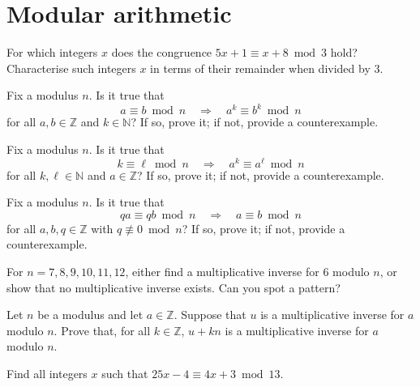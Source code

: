 \section{Modular arithmetic}


\begin{exercise}
For which integers $x$ does the congruence $5x+1 \equiv x+8 \bmod 3$ hold? Characterise such integers $x$ in terms of their remainder when divided by $3$.
\end{exercise}



\begin{exercise}
Fix a modulus $n$. Is it true that
\[ a \equiv b \bmod n \quad \Rightarrow \quad a^k \equiv b^k \bmod n \] for all $a,b \in \mathbb{Z}$ and $k \in \mathbb{N}$? If so, prove it; if not, provide a counterexample.
\end{exercise}

\begin{exercise}
Fix a modulus $n$. Is it true that
\[ k \equiv \ell \bmod n \quad \Rightarrow \quad a^k \equiv a^{\ell} \bmod n \]
for all $k,\ell \in \mathbb{N}$ and $a \in \mathbb{Z}$? If so, prove it; if not, provide a counterexample.
\end{exercise}

\begin{exercise}
Fix a modulus $n$. Is it true that
\[ qa \equiv qb \bmod n \quad \Rightarrow \quad a \equiv b \bmod n \]
for all $a,b,q \in \mathbb{Z}$ with $q \not \equiv 0 \bmod n$? If so, prove it; if not, provide a counterexample.
\end{exercise}


\begin{exercise}
For $n=7,8,9,10,11,12$, either find a multiplicative inverse for $6$ modulo $n$, or show that no multiplicative inverse exists. Can you spot a pattern?
\end{exercise}



\begin{exercise}
Let $n$ be a modulus and let $a \in \mathbb{Z}$. Suppose that $u$ is a multiplicative inverse for $a$ modulo $n$. Prove that, for all $k \in \mathbb{Z}$, $u+kn$ is a multiplicative inverse for $a$ modulo $n$.
\end{exercise}


\begin{exercise}
Find all integers $x$ such that $25x-4 \equiv 4x+3 \bmod 13$.
\end{exercise}



